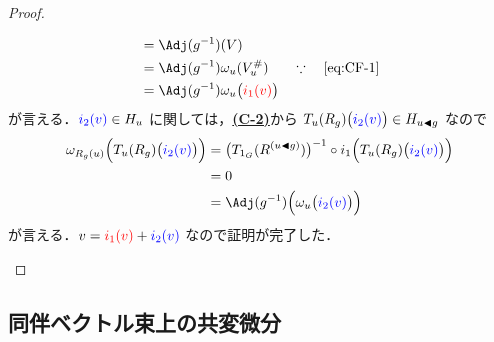 \documentclass[TQFT_main]{subfiles}
\begin{document}
\begin{proof}
\begin{enumerate}
\begin{description}
\begin{description}
\begin{align}
                    &= \Adj (g^{-1})(V) &&\\
                    &= \Adj (g^{-1})\omega_u(V^\#_u) &&\because\quad \text{\eqref{eq:CF-1}}\\
                    &= \Adj (g^{-1})\omega_u\bigl(\textcolor{red}{i_1(v)}\bigr) &&
                \end{align}
                が言える．$\textcolor{blue}{i_2(v)} \in H_u$ に関しては，\hyperref[def:connection]{\textbf{\textsf{(C-2)}}}から $T_u (R_g)\bigl(\textcolor{blue}{i_2(v)}\bigr) \in H_{u \blacktriangleleft g}$ なので
                \begin{align}
                    \omega_{R_g(u)} \Bigl( T_u (R_g)\bigl(\textcolor{blue}{i_2(v)}\bigr) \Bigr) 
                    &= \bigl( T_{1_G}(R^{(u \btl g)}) \bigr)^{-1} \circ i_1 \Bigl(T_u (R_g)\bigl(\textcolor{blue}{i_2(v)}\bigr)\Bigr) \\
                    &= 0 \\
                    &= \Adj(g^{-1}) \Bigl( \omega_u \bigl(\textcolor{blue}{i_2(v)}\bigr) \Bigr) 
                \end{align}
                が言える．$v = \textcolor{red}{i_1(v)} + \textcolor{blue}{i_2(v)}$ なので証明が完了した．
                
                
            \end{description}
            
        \end{description}
        
    \end{enumerate}
\end{proof}

\subsection{同伴ベクトル束上の共変微分}

\end{document}
